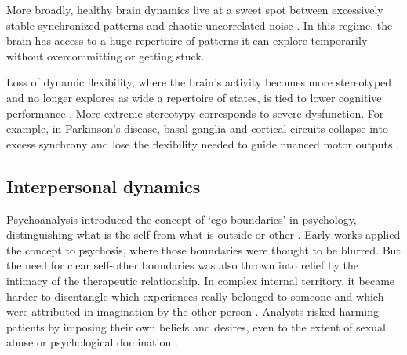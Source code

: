 \documentclass[12pt]{article}
\begin{document}
More broadly, healthy brain dynamics live at a sweet spot between excessively stable synchronized patterns and chaotic uncorrelated noise \citep{beggs2003neuronal, chialvo2010emergent, tognoli2014metastable, deco2011emerging, bak1987self, shew2011information, rabinovich2008transient, haldeman2005critical, kotler2025pathfinding}. In this regime, the brain has access to a huge repertoire of patterns it can explore temporarily without overcommitting or getting stuck. 

Loss of dynamic flexibility, where the brain's activity becomes more stereotyped and no longer explores as wide a repertoire of states, is tied to lower cognitive performance \citep{garrett2013bold, grady2014understanding, cocchi2017criticality, muller2025critical, shew2009neuronal}. More extreme stereotypy corresponds to severe dysfunction. For example, in Parkinson's disease, basal ganglia and cortical circuits collapse into excess synchrony and lose the flexibility needed to guide nuanced motor outputs \citep{hammond2007pathological, brown2003rhythmic}. 


\subsection{Interpersonal dynamics}



Psychoanalysis introduced the concept of `ego boundaries' in psychology, distinguishing what is the self from what is outside or other \citep{federn1928narcissism, tausk1919entstehung}. Early works applied the concept to psychosis, where those boundaries were thought to be blurred. But the need for clear self-other boundaries was also thrown into relief by the intimacy of the therapeutic relationship. In complex internal territory, it became harder to disentangle which experiences really belonged to someone and which were attributed in imagination by the other person \citep{freud1910future, heimann1950countertransference, gelso2007countertransference}. Analysts risked harming patients by imposing their own beliefs and desires, even to the extent of sexual abuse or psychological domination \citep{gabbard1995boundaries}. 
\end{document}
